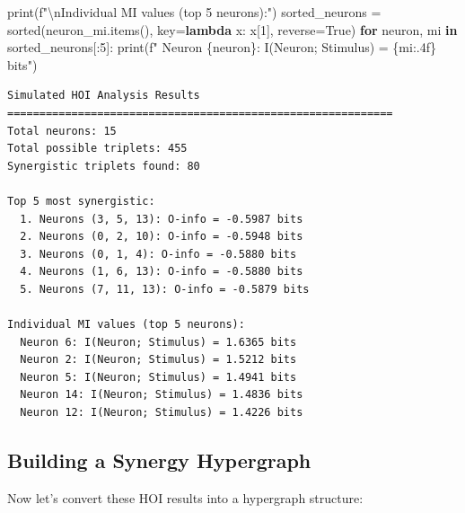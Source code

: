 \documentclass[
  11pt,
  letterpaper,
  oneside,
  openany]{book}
\newenvironment{Shaded}{\begin{snugshade}}{\end{snugshade}}
\newcommand{\BuiltInTok}[1]{\textcolor[rgb]{0.00,0.23,0.31}{#1}}
\newcommand{\CharTok}[1]{\textcolor[rgb]{0.13,0.47,0.30}{#1}}
\newcommand{\ControlFlowTok}[1]{\textcolor[rgb]{0.00,0.23,0.31}{\textbf{#1}}}
\newcommand{\DecValTok}[1]{\textcolor[rgb]{0.68,0.00,0.00}{#1}}
\newcommand{\KeywordTok}[1]{\textcolor[rgb]{0.00,0.23,0.31}{\textbf{#1}}}
\newcommand{\NormalTok}[1]{\textcolor[rgb]{0.00,0.23,0.31}{#1}}
\newcommand{\OperatorTok}[1]{\textcolor[rgb]{0.37,0.37,0.37}{#1}}
\newcommand{\SpecialCharTok}[1]{\textcolor[rgb]{0.37,0.37,0.37}{#1}}
\newcommand{\SpecialStringTok}[1]{\textcolor[rgb]{0.13,0.47,0.30}{#1}}
\newcommand{\VariableTok}[1]{\textcolor[rgb]{0.07,0.07,0.07}{#1}}
\begin{document}
\begin{Shaded}
\begin{Highlighting}[]
\BuiltInTok{print}\NormalTok{(}\SpecialStringTok{f"}\CharTok{\textbackslash{}n}\SpecialStringTok{Individual MI values (top 5 neurons):"}\NormalTok{)}
\NormalTok{sorted\_neurons }\OperatorTok{=} \BuiltInTok{sorted}\NormalTok{(neuron\_mi.items(), key}\OperatorTok{=}\KeywordTok{lambda}\NormalTok{ x: x[}\DecValTok{1}\NormalTok{], reverse}\OperatorTok{=}\VariableTok{True}\NormalTok{)}
\ControlFlowTok{for}\NormalTok{ neuron, mi }\KeywordTok{in}\NormalTok{ sorted\_neurons[:}\DecValTok{5}\NormalTok{]:}
    \BuiltInTok{print}\NormalTok{(}\SpecialStringTok{f"  Neuron }\SpecialCharTok{\{}\NormalTok{neuron}\SpecialCharTok{\}}\SpecialStringTok{: I(Neuron; Stimulus) = }\SpecialCharTok{\{}\NormalTok{mi}\SpecialCharTok{:.4f\}}\SpecialStringTok{ bits"}\NormalTok{)}
\end{Highlighting}
\end{Shaded}

\begin{verbatim}
Simulated HOI Analysis Results
============================================================
Total neurons: 15
Total possible triplets: 455
Synergistic triplets found: 80

Top 5 most synergistic:
  1. Neurons (3, 5, 13): O-info = -0.5987 bits
  2. Neurons (0, 2, 10): O-info = -0.5948 bits
  3. Neurons (0, 1, 4): O-info = -0.5880 bits
  4. Neurons (1, 6, 13): O-info = -0.5880 bits
  5. Neurons (7, 11, 13): O-info = -0.5879 bits

Individual MI values (top 5 neurons):
  Neuron 6: I(Neuron; Stimulus) = 1.6365 bits
  Neuron 2: I(Neuron; Stimulus) = 1.5212 bits
  Neuron 5: I(Neuron; Stimulus) = 1.4941 bits
  Neuron 14: I(Neuron; Stimulus) = 1.4836 bits
  Neuron 12: I(Neuron; Stimulus) = 1.4226 bits
\end{verbatim}

\subsection{Building a Synergy
Hypergraph}\label{building-a-synergy-hypergraph}

Now let's convert these HOI results into a hypergraph structure:
\end{document}
